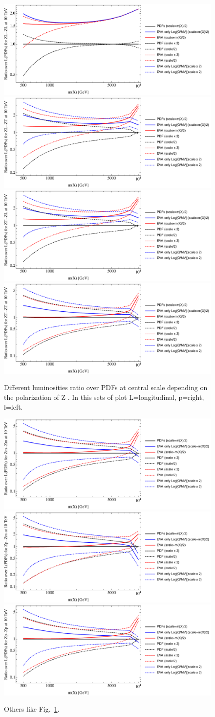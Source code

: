\documentclass[a4paper,11pt]{article}
\begin{document}
\begin{figure}[!t]
\includegraphics[width=0.46\linewidth]{Notebooks/PlotLumi/10TeV/ratios/ZL-ZL.pdf}
\includegraphics[width=0.46\linewidth]{Notebooks/PlotLumi/10TeV/ratios/ZL-ZT.pdf}
\includegraphics[width=0.46\linewidth]{Notebooks/PlotLumi/10TeV/ratios/ZT-ZL.pdf}
\includegraphics[width=0.46\linewidth]{Notebooks/PlotLumi/10TeV/ratios/ZT-ZT.pdf}
\caption{Different luminosities ratio over PDFs at central scale depending on the polarization of Z \label{fig:lumiratioZZpol}. In this sets of plot L=longitudinal, p=right, l=left.}
\end{figure}

\begin{figure}[!t]
\includegraphics[width=0.46\linewidth]{Notebooks/PlotLumi/10TeV/ratios/Zm-Zm.pdf}
\includegraphics[width=0.46\linewidth]{Notebooks/PlotLumi/10TeV/ratios/Zp-Zm.pdf}
\includegraphics[width=0.46\linewidth]{Notebooks/PlotLumi/10TeV/ratios/Zp-Zp.pdf}
\caption{Others like Fig.~\ref{fig:lumiratioZZpol}. \label{fig:lumiratioZZpol2}}
\end{figure}
\end{document}
